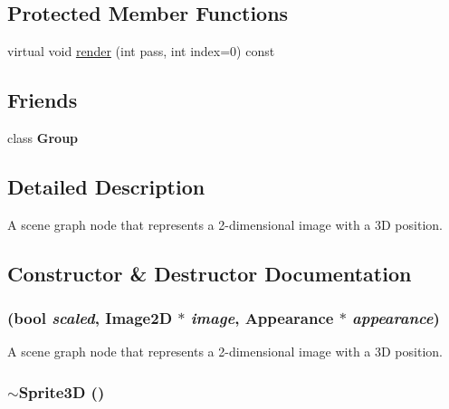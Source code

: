 \subsection*{Protected Member Functions}
\begin{CompactItemize}
\item 
virtual void \hyperlink{classm3g_1_1Sprite3D_1efcb1973989d9963d5bd6d03065d389}{render} (int pass, int index=0) const 
\end{CompactItemize}
\subsection*{Friends}
\begin{CompactItemize}
\item 
\hypertarget{classm3g_1_1Sprite3D_2697825715974a353728f0d4d5658112}{
class \textbf{Group}}
\label{classm3g_1_1Sprite3D_2697825715974a353728f0d4d5658112}

\end{CompactItemize}


\subsection{Detailed Description}
A scene graph node that represents a 2-dimensional image with a 3D position. 

\subsection{Constructor \& Destructor Documentation}
\hypertarget{classm3g_1_1Sprite3D_9cb33fd453d441ed8e99b95f5e29df0c}{
\subsubsection[{Sprite3D}]{ (bool {\em scaled}, \/  {\bf Image2D} $\ast$ {\em image}, \/  {\bf Appearance} $\ast$ {\em appearance})}}
\label{classm3g_1_1Sprite3D_9cb33fd453d441ed8e99b95f5e29df0c}


A scene graph node that represents a 2-dimensional image with a 3D position. \hypertarget{classm3g_1_1Sprite3D_a57bd1e3141ba11c88ddec1e46c188d6}{
\subsubsection[{$\sim$Sprite3D}]{\setlength{\rightskip}{0pt plus 5cm}$\sim${\bf Sprite3D} ()}}
\label{classm3g_1_1Sprite3D_a57bd1e3141ba11c88ddec1e46c188d6}


